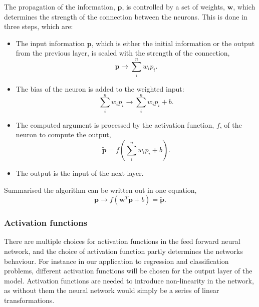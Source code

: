 \documentclass[a4paper,
amsfonts,
amssymb,
amsmath,
reprint,
showkeys,
nofootinbib,
twoside]{revtex4-2}
\begin{document}
The propagation of the information, $\mathbf{p}$, is controlled by a set of weights, $\mathbf{w}$, which determines the strength of the connection between the neurons. This is done in three steps, which are:
\begin{itemize}
    \item The input information $\mathbf{p}$, which is either the initial information or the output from the previous layer, is scaled with the strength of the connection,
    \begin{equation}
        \mathbf{p} \longrightarrow \sum_i^n w_i p_i.
    \end{equation}

    \item The bias of the neuron is added to the weighted input:
    \begin{equation}
        \sum_i^n w_i p_i \longrightarrow \sum_i^n w_i p_i + b.
    \end{equation}
    \item The computed argument is processed by the activation function, $f$, of the neuron to compute the output,
    \begin{equation}
        \tilde{\mathbf{p}} = f \left( \sum_i^n w_i p_i + b \right).
    \end{equation}
    \item The output is the input of the next layer.
\end{itemize}

Summarised the algorithm can be written out in one equation,
\begin{equation}
    \mathbf{p} \longrightarrow f(\mathbf{w}^T \mathbf{p} + b) = \tilde{\mathbf{p}}.
\end{equation}

\subsubsection{Activation functions}

There are multiple choices for activation functions in the feed forward neural network, and the choice of activation function partly determines the networks behaviour. For instance in our application to regression and classification problems, different activation functions will be chosen for the output layer of the model. Activation functions are needed to introduce non-linearity in the network, as without them the neural network would simply be a series of linear transformations.
\end{document}
